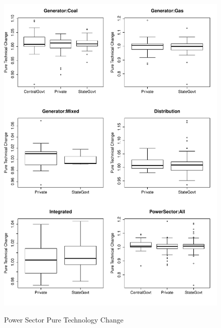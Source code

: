 \begin{figure}[ht]
	\centering
	\caption{Power Sector Pure Technology Change}
		\includegraphics[width=1.00\textwidth]{chapter03/PureTechChange.pdf}
	\label{fig:PureTechChange}
\end{figure}

